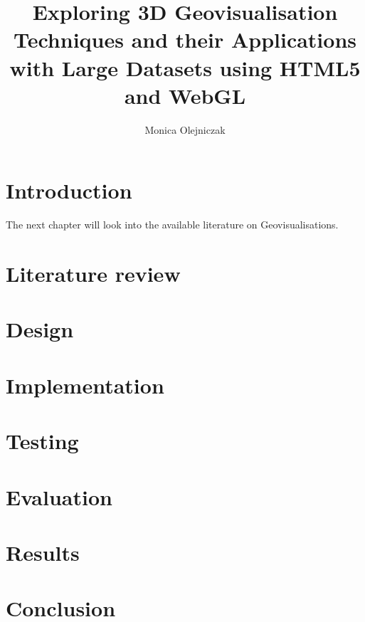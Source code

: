 \documentclass[
	paper=A4,
    titlepage=true,
	fontsize=11pt,
	parskip=half
]{scrreprt}
\title{Exploring 3D Geovisualisation Techniques and their Applications with Large Datasets using HTML5 and WebGL}
\author{Monica Olejniczak}
\begin{document}
	

	\setcounter{page}{1}
	
	\chapter{Introduction} {
	\label{ch:introduction}
		
	}

	The next chapter will look into the available literature on Geovisualisations.

	\chapter{Literature review} {
	\label{ch:literature_review}
		
	}

	
	\chapter{Design} {
	\label{ch:design}
			
	}

	
	\chapter{Implementation} {
	\label{ch:implementation}
		
	}


	\chapter{Testing} {
	\label{ch:testing}
		
	}


	\chapter{Evaluation} {
	\label{ch:evaluation}
		
	}


	\chapter{Results} {
	\label{ch:results}
		
	}


	\chapter{Conclusion} {
	\label{ch:conclusion}
		
	}
	
	\renewcommand{\bibname}{References}
	\printbibliography[notcategory=exclude]
	
\end{document}
